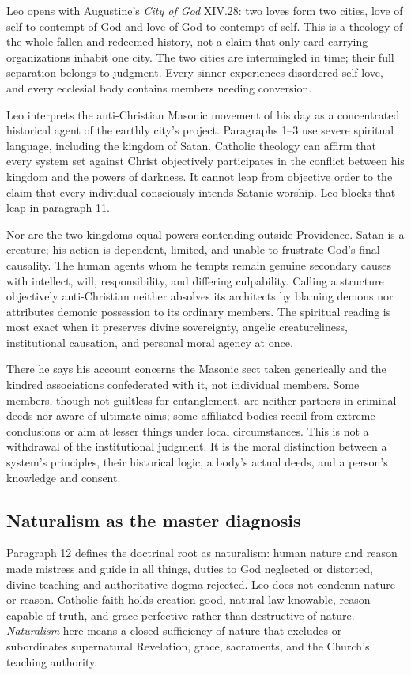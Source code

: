 Leo opens with Augustine's \emph{City of God} XIV.28: two loves form two cities, love of self to contempt of God and love of God to contempt of self. This is a theology of the whole fallen and redeemed history, not a claim that only card-carrying organizations inhabit one city. The two cities are intermingled in time; their full separation belongs to judgment. Every sinner experiences disordered self-love, and every ecclesial body contains members needing conversion.

Leo interprets the anti-Christian Masonic movement of his day as a concentrated historical agent of the earthly city's project. Paragraphs 1--3 use severe spiritual language, including the kingdom of Satan. Catholic theology can affirm that every system set against Christ objectively participates in the conflict between his kingdom and the powers of darkness. It cannot leap from objective order to the claim that every individual consciously intends Satanic worship. Leo blocks that leap in paragraph 11.

Nor are the two kingdoms equal powers contending outside Providence. Satan is a creature; his action is dependent, limited, and unable to frustrate God's final causality. The human agents whom he tempts remain genuine secondary causes with intellect, will, responsibility, and differing culpability. Calling a structure objectively anti-Christian neither absolves its architects by blaming demons nor attributes demonic possession to its ordinary members. The spiritual reading is most exact when it preserves divine sovereignty, angelic creatureliness, institutional causation, and personal moral agency at once.

There he says his account concerns the Masonic sect taken generically and the kindred associations confederated with it, not individual members. Some members, though not guiltless for entanglement, are neither partners in criminal deeds nor aware of ultimate aims; some affiliated bodies recoil from extreme conclusions or aim at lesser things under local circumstances. This is not a withdrawal of the institutional judgment. It is the moral distinction between a system's principles, their historical logic, a body's actual deeds, and a person's knowledge and consent.

\subsection{Naturalism as the master diagnosis}

Paragraph 12 defines the doctrinal root as naturalism: human nature and reason made mistress and guide in all things, duties to God neglected or distorted, divine teaching and authoritative dogma rejected. Leo does not condemn nature or reason. Catholic faith holds creation good, natural law knowable, reason capable of truth, and grace perfective rather than destructive of nature. \emph{Naturalism} here means a closed sufficiency of nature that excludes or subordinates supernatural Revelation, grace, sacraments, and the Church's teaching authority.

